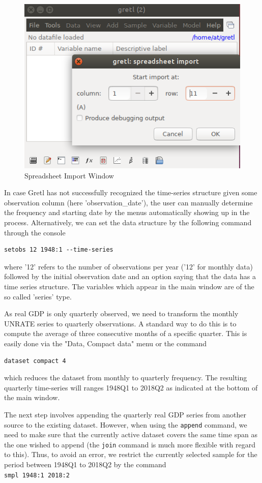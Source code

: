 \documentclass[11pt]{article}
\begin{document}
\begin{figure}[!h]
	\centering
	\includegraphics[width=.42\textwidth]{../figures/open_file}
	\caption{Spreadsheet Import Window}
	\label{fig:load}
\end{figure}

In case Gretl has not successfully recognized the time-series structure given some observation column (here 'observation\_date'), the user can manually determine the frequency and starting date by the menus automatically showing up in the process. Alternatively, we can set the data structure by the following command through the console
\begin{verbatim}
setobs 12 1948:1 --time-series
\end{verbatim}
where '12' refers to the number of observations per year ('12' for monthly data) followed by the initial observation date and an option saying that the data has a time series structure. The variables which appear in the main window are of the so called 'series' type.

As real GDP is only quarterly observed, we need to transform the monthly UNRATE series to quarterly observations. A standard way to do this is to compute the average of three consecutive months of a specific quarter. This is easily done via the "Data, Compact data" menu or the command
\begin{verbatim}
dataset compact 4
\end{verbatim}
which reduces the dataset from monthly to quarterly frequency. The resulting quarterly time-series will ranges 1948Q1 to 2018Q2 as indicated at the bottom of the main window.

The next step involves appending the quarterly real GDP series from another source to the existing dataset. However, when using the \texttt{append} command, we need to make sure that the currently active dataset covers the same time span as the one wished to append (the \texttt{join} command is much more flexible with regard to this). Thus, to avoid an error, we restrict the currently selected sample for the period between 1948Q1 to 2018Q2 by the command\\
\texttt{smpl 1948:1 2018:2}
\end{document}

